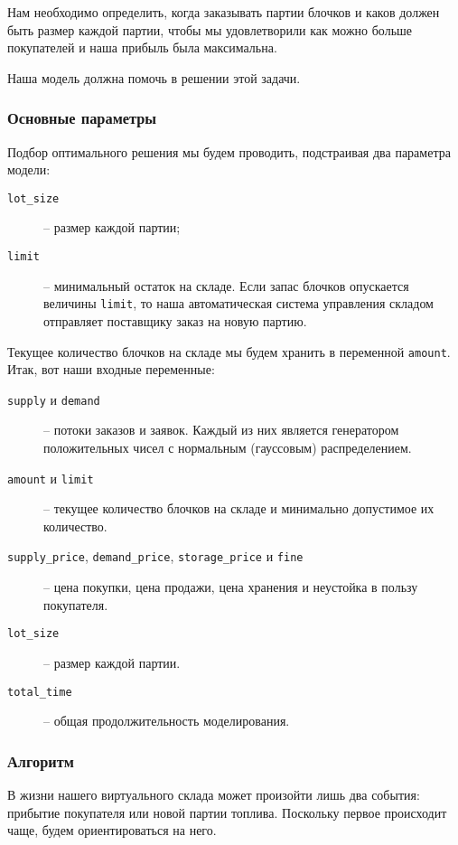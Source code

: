 \documentclass[12pt,final]{article}
\begin{document}
Нам необходимо определить, когда заказывать партии блочков и каков должен быть размер каждой партии, чтобы мы удовлетворили как можно больше покупателей и наша прибыль была максимальна.

Наша модель должна помочь в решении этой задачи.

\subsubsection{Основные параметры}

Подбор оптимального решения мы будем проводить, подстраивая два параметра модели:

\begin{description}
    \item[\texttt{lot\_size}] -- размер каждой партии;
    \item[\texttt{limit}] -- минимальный остаток на складе. Если запас блочков опускается величины \texttt{limit}, то наша автоматическая система управления складом отправляет поставщику заказ на новую партию.
\end{description}

Текущее количество блочков на складе мы будем хранить в переменной \texttt{amount}. Итак, вот наши входные переменные:

\begin{description}
    \item[\texttt{supply} и \texttt{demand}] -- потоки заказов и заявок. Каждый из них является генератором положительных чисел с нормальным (гауссовым) распределением.
    \item[\texttt{amount} и \texttt{limit}] -- текущее количество блочков на складе и минимально допустимое их количество.
    \item[\texttt{supply\_price}, \texttt{demand\_price}, \texttt{storage\_price} и \texttt{fine}] -- цена покупки, цена продажи, цена хранения и неустойка в пользу покупателя.
    \item[\texttt{lot\_size}] -- размер каждой партии.
    \item[\texttt{total\_time}] -- общая продолжительность моделирования.
\end{description}

\subsubsection{Алгоритм}

В жизни нашего виртуального склада может произойти лишь два события: прибытие покупателя или новой партии топлива. Поскольку первое происходит чаще, будем ориентироваться на него.
\end{document}
